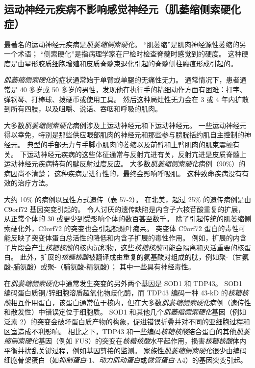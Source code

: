 \subsection{运动神经元疾病不影响感觉神经元（肌萎缩侧索硬化症）}

最著名的运动神经元疾病是\textit{肌萎缩侧索硬化}。
“肌萎缩”是肌肉神经源性萎缩的另一个术语；
“侧索硬化”是指病理学家在尸检时检查脊髓时感觉到的硬度。
这种硬度是由星形胶质细胞增殖和皮质脊髓束退化引起的脊髓侧柱瘢痕形成引起的。


\textit{肌萎缩侧索硬化}的症状通常始于单臂或单腿的无痛性无力。
通常情况下，患者通常是 40 多岁或 50 多岁的男性，发现他在执行手的精细动作方面有困难：打字、弹钢琴、打棒球、拨硬币或使用工具。
然后这种局灶性无力会在 3 或 4 年内扩散到所有四肢，以及咀嚼、说话、吞咽和呼吸的肌肉。


大多数\textit{肌萎缩侧索硬化}病例涉及上运动神经元和下运动神经元。
一些运动神经元得以幸免，特别是那些供应眼部肌肉的神经元和那些参与膀胱括约肌自主控制的神经元。
典型的手部无力与手脚小肌肉的萎缩以及前臂和上臂肌肉的肌束震颤有关。
下运动神经元疾病的这些体征通常与反射亢进有关，反射亢进是皮质脊髓上运动神经元疾病特有的腱反射过度反应。
大多数\textit{肌萎缩侧索硬化}病例（90\%）的病因尚不清楚；
这种疾病是进行性的，最终会影响呼吸肌。
这种致命疾病没有有效的治疗方法。


大约 10\% 的病例以显性方式遗传（表 57-2）。
在北美，超过 25\% 的遗传病例是由 C9orf72 基因突变引起的。
令人讨厌的遗传缺陷是内含子六核苷酸重复的扩展，从正常个体的 30 或更少到受影响个体的数百甚至数千。
除了引起传统的肌萎缩侧索硬化外，C9orf72 的突变也会引起额颞叶痴呆。
突变体 C9orf72 蛋白的毒性可能反映了突变体蛋白总活性的降低和内含子扩展的毒性作用。
例如，扩展的内含子片段会产生\textit{核糖核酸}的核内沉积物，这些\textit{核糖核酸}可能会隔离和灭活重要的核蛋白。
此外，扩展的\textit{核糖核酸}被翻译成由重复的氨基酸对组成的肽，例如聚-（甘氨酸-脯氨酸）或聚-（脯氨酸-精氨酸）；
其中一些具有神经毒性。


在\textit{肌萎缩侧索硬化}中通常发生突变的另外两个基因是 SOD1 和 TDP43。
SOD1 编码蛋白质铜/锌细胞溶质超氧化物歧化酶，而 TDP43 编码一种 43-kD 的\textit{核糖核酸}相互作用蛋白，该蛋白通常位于核内，但在大多数\textit{肌萎缩侧索硬化}病例（遗传性和散发性）中错误定位于细胞质。
SOD1 和其他几个\textit{肌萎缩侧索硬化}基因（例如泛素 2）的突变会破坏蛋白质产物的构象，促进错误折叠并对不同的亚细胞过程和区室造成不利影响。
相比之下，TDP43 和一些编码\textit{核糖核酸}结合蛋白的其他\textit{肌萎缩侧索硬化}基因（例如 FUS）的突变在\textit{核糖核酸}水平起作用，损害\textit{核糖核酸}体内平衡并扰乱关键过程，例如基因剪接的监测。
家族性\textit{肌萎缩侧索硬化}很少由编码细胞骨架蛋白（如\textit{抑制蛋白}-1、\textit{动力肌动蛋白}或\textit{微管蛋白}-A4）的基因突变引起。


